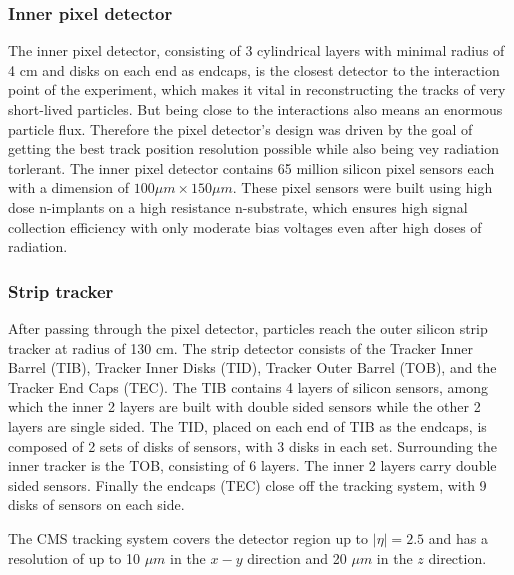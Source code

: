 \subsubsection{Inner pixel detector}
The inner pixel detector, consisting of 3 cylindrical layers with minimal radius of 4 cm and disks on each end as endcaps, is the closest detector to the interaction point of the experiment, which makes it vital in reconstructing the tracks of very short-lived particles. But being close to the interactions also means an enormous particle flux. Therefore the pixel detector's design was driven by the goal of getting the best track position resolution possible while also being vey radiation torlerant. The inner pixel detector contains 65 million silicon pixel sensors each with a dimension of $100\mu m \times 150\mu m$. These pixel sensors were built using high dose n-implants on a high resistance n-substrate, which ensures high signal collection efficiency with only moderate bias voltages even after high doses of radiation.
\subsubsection{Strip tracker}
After passing through the pixel detector, particles reach the outer silicon strip tracker at radius of 130 cm. The strip detector consists of the Tracker Inner Barrel (TIB), Tracker Inner Disks (TID), Tracker Outer Barrel (TOB), and the Tracker End Caps (TEC). The TIB contains 4 layers of silicon sensors, among which the inner 2 layers are built with double sided sensors while the other 2 layers are single sided. The TID, placed on each end of TIB as the endcaps, is composed of 2 sets of disks of sensors, with 3 disks in each set. Surrounding the inner tracker is the TOB, consisting of 6 layers. The inner 2 layers carry double sided sensors. Finally the endcaps (TEC) close off the tracking system, with 9 disks of sensors on each side. 

\vspace{0.3cm}
The CMS tracking system covers the detector region up to $|\eta| = 2.5$ and has a resolution of up to 10 $\mu m$ in the $x-y$ direction and 20 $\mu m$ in the $z$ direction. 


